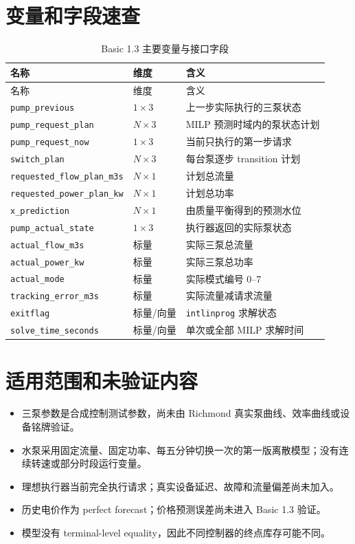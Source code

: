 \documentclass[UTF8,a4paper,11pt]{ctexart}
\newcommand{\code}[1]{\texttt{#1}}
\begin{document}
\section{变量和字段速查}

\begin{longtable}{p{4.7cm}p{2.2cm}p{7.1cm}}
\caption{Basic 1.3 主要变量与接口字段}\label{tab:variables}\\
\toprule
名称 & 维度 & 含义 \\
\midrule
\endfirsthead
\toprule
名称 & 维度 & 含义 \\
\midrule
\endhead
\code{pump\_previous} & $1\times3$ & 上一步实际执行的三泵状态 \\
\code{pump\_request\_plan} & $N\times3$ & MILP 预测时域内的泵状态计划 \\
\code{pump\_request\_now} & $1\times3$ & 当前只执行的第一步请求 \\
\code{switch\_plan} & $N\times3$ & 每台泵逐步 transition 计划 \\
\code{requested\_flow\_plan\_m3s} & $N\times1$ & 计划总流量 \\
\code{requested\_power\_plan\_kw} & $N\times1$ & 计划总功率 \\
\code{x\_prediction} & $N\times1$ & 由质量平衡得到的预测水位 \\
\code{pump\_actual\_state} & $1\times3$ & 执行器返回的实际泵状态 \\
\code{actual\_flow\_m3s} & 标量 & 实际三泵总流量 \\
\code{actual\_power\_kw} & 标量 & 实际三泵总功率 \\
\code{actual\_mode} & 标量 & 实际模式编号 0--7 \\
\code{tracking\_error\_m3s} & 标量 & 实际流量减请求流量 \\
\code{exitflag} & 标量/向量 & \code{intlinprog} 求解状态 \\
\code{solve\_time\_seconds} & 标量/向量 & 单次或全部 MILP 求解时间 \\
\bottomrule
\end{longtable}

\section{适用范围和未验证内容}

\begin{itemize}
  \item 三泵参数是合成控制测试参数，尚未由 Richmond 真实泵曲线、效率曲线或设备铭牌验证。
  \item 水泵采用固定流量、固定功率、每五分钟切换一次的第一版离散模型；没有连续转速或部分时段运行变量。
  \item 理想执行器当前完全执行请求；真实设备延迟、故障和流量偏差尚未加入。
  \item 历史电价作为 perfect forecast；价格预测误差尚未进入 Basic 1.3 验证。
  \item 模型没有 terminal-level equality，因此不同控制器的终点库存可能不同。
\end{itemize}
\end{document}
